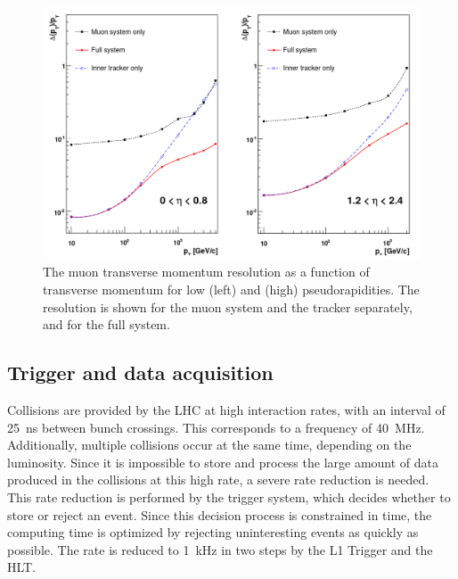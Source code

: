 \begin{figure}[ht]
  \centering
 \includegraphics[width=.9\textwidth]{muon_res}
 \caption{The muon transverse momentum resolution as a function of transverse momentum for low (left) and (high) pseudorapidities. The resolution is shown for the muon system and the tracker separately, and for the full system.~\cite{Chatrchyan:2008aa}}
 \label{fig:muon_res}
\end{figure}

\subsection{Trigger and data acquisition}

Collisions are provided by the \ac{LHC} at high interaction rates, with an interval of \SI{25}{ns} between bunch crossings. This corresponds to a frequency of \SI{40}{MHz}. Additionally, multiple collisions occur at the same time, depending on the luminosity. Since it is impossible to store and process the large amount of data produced in the collisions at this high rate, a severe rate reduction is needed. This rate reduction is performed by the trigger system, which decides whether to store or reject an event. Since this decision process is constrained in time, the computing time is optimized by rejecting uninteresting events as quickly as possible. The rate is reduced to \SI{1}{kHz} in two steps by the \ac{L1} Trigger and the \ac{HLT}.

